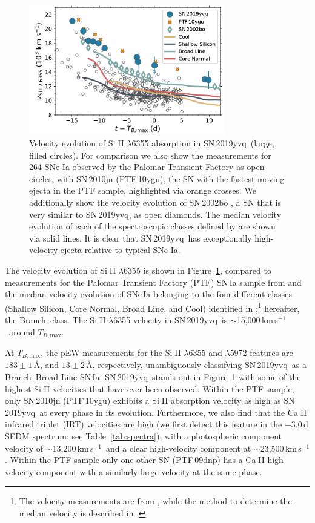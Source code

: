 \documentclass[twocolumn]{aastex63}
\def\ion#1#2{#1$\;${\footnotesize\rm{#2}}\relax}
\newcommand{\tbmax}{$T_{B,\mathrm{max}}$}
\newcommand{\kms}{km\,s$^{-1}$}
\newcommand{\sn}{SN\,2019yvq}
\begin{document}
\begin{figure}
    \centering
    \includegraphics[width=3.35in]{./figures/vel_evolution.pdf}
    \caption{Velocity evolution of \ion{Si}{II} $\lambda$6355 absorption in
    \sn\ (large, filled circles). For comparison we also show the measurements
    for 264 SNe Ia observed by the Palomar Transient Factory \citep[PTF; data
    from][]{Maguire14} as open circles, with SN\,2010jn (PTF\,10ygu), the SN
    with the fastest moving ejecta in the PTF sample, highlighted via orange
    crosses. We additionally show the velocity evolution of SN\,2002bo
    \citep[data from][]{Benetti04}, a SN that is very similar to \sn, as open
    diamonds. The median velocity evolution of each of the spectroscopic
    classes defined by \citet[][Shallow Silicon, Core Normal, Broad Line, and
    Cool]{Branch06} are shown via solid lines. It is clear that \sn\ has
    exceptionally high-velocity ejecta relative to typical SNe Ia.}
    \label{fig:vel_evo}
\end{figure}

The velocity evolution of \ion{Si}{II} $\lambda$6355 is shown in
Figure~\ref{fig:vel_evo}, compared to measurements for the Palomar Transient
Factory (PTF) SN\,Ia sample from \citet{Maguire14} and the median velocity
evolution of SNe\,Ia belonging to the four different classes (Shallow Silicon,
Core Normal, Broad Line, and Cool) identified in
\citet{Branch06};\footnote{The velocity measurements are from
\citet{Blondin12}, while the method to determine the median velocity is
described in \citet{Miller18}.} hereafter, the Branch~class. The \ion{Si}{II}
$\lambda$6355 velocity in \sn\ is $\sim$15,000\,\kms\ around \tbmax.

At \tbmax, the pEW measurements for the \ion{Si}{II} $\lambda$6355 and
$\lambda$5972 features are $183\pm1$\,\AA, and $13\pm2$\,\AA, respectively,
unambiguously classifying \sn\ as a Branch~Broad Line SN\,Ia. \sn\ stands out
in Figure~\ref{fig:vel_evo} with some of the highest \ion{Si}{II} velocities
that have ever been observed. Within the PTF sample, only SN\,2010jn
(PTF\,10ygu) exhibits a \ion{Si}{II} absorption velocity as high as \sn\ at
every phase in its evolution. Furthermore, we also find that the \ion{Ca}{II}
infrared triplet (IRT) velocities are high (we first detect this feature in
the $-3.0$\,d SEDM spectrum; see Table~\ref{tab:spectra}), with a photospheric
component velocity of $\sim$13,200\,\kms\ and a clear high-velocity component
at $\sim$23,500\,\kms. Within the PTF sample only one other SN (PTF\,09dnp)
has a \ion{Ca}{II} high-velocity component with a similarly large velocity at
the same phase.
\end{document}
